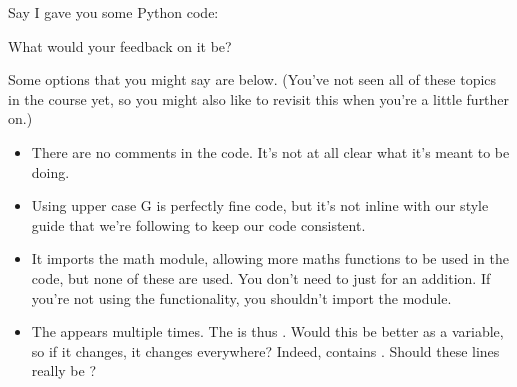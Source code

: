 \documentclass[letterpaper,10pt,british]{sphinxmanual}
\begin{document}
\sphinxAtStartPar
Say I gave you some Python code:

\begin{sphinxVerbatim}[commandchars=\\\{\}]

      
      
      

      
        
        


   
\end{sphinxVerbatim}

\sphinxAtStartPar
What would your feedback on it be?

\sphinxAtStartPar
Some options that you might say are below. (You’ve not seen all of these topics in the course yet, so you might also like to re\sphinxhyphen{}visit this when you’re a little further on.)
\begin{itemize}
\item {} 
\sphinxAtStartPar
There are no comments in the code. It’s not at all clear what it’s meant to be doing.

\item {} 
\sphinxAtStartPar
Using upper case G is perfectly fine code, but it’s not in\sphinxhyphen{}line with our style guide that we’re following to keep our code consistent.

\item {} 
\sphinxAtStartPar
It imports the math module, allowing more maths functions to be used in the code, but none of these are used. You don’t need to  just for an addition. If you’re not using the functionality, you shouldn’t import the module.

\item {} 
\sphinxAtStartPar
The  appears multiple times. The  is thus . Would this be better as a variable, so if it changes, it changes everywhere? Indeed,  contains . Should these lines really be ?

\end{itemize}
\end{document}
